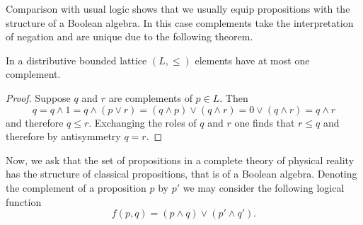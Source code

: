 Comparison with usual logic shows that we usually equip propositions with the structure of a Boolean algebra. In this case complements take the interpretation of negation and are unique due to the following theorem.

\begin{theorem}\label{thm:distributive}
In a distributive bounded lattice $(L,\leq)$ elements have at most one complement.
\end{theorem}

\begin{proof}
Suppose $q$ and $r$ are complements of $p\in L$. Then
\begin{equation}
q = q\wedge 1 = q\wedge (p\vee r) =(q\wedge p)\vee(q\wedge r) = 0\vee(q\wedge r)=q\wedge r 
\end{equation}
and therefore $q\leq r$. Exchanging the roles of $q$ and $r$ one finds that $r\leq q$ and therefore by antisymmetry $q=r$.
\end{proof}

Now, we ask that the set of propositions in a complete theory of physical reality has the structure of classical propositions, that is of a Boolean algebra. Denoting the complement of a proposition $p$ by $p'$ we may consider the following logical function
\begin{equation}
f(p,q)=(p\wedge q)\vee (p' \wedge q').
\end{equation}

